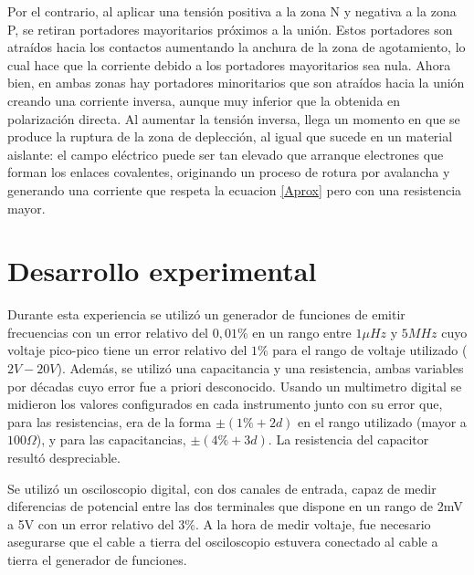 \documentclass[11pt,a4paper]{article}
\begin{document}
 Por el contrario, al aplicar una tensión positiva a la zona N y negativa a la zona P, se retiran portadores mayoritarios próximos a la unión. Estos portadores son atraídos hacia los contactos aumentando la anchura de la zona de agotamiento, lo cual hace que la corriente debido a los portadores mayoritarios sea nula. Ahora bien, en ambas zonas hay portadores minoritarios que son atraídos hacia la unión creando una corriente inversa, aunque muy inferior que la obtenida en polarización directa. Al aumentar la tensión inversa, llega un momento en que se produce la ruptura de la zona de deplección, al igual que sucede en un material aislante: el campo eléctrico puede ser tan elevado que arranque electrones que forman los enlaces covalentes, originando un proceso de rotura por avalancha y generando una corriente que respeta la ecuacion \eqref{Aprox} pero con una resistencia mayor.


\section{Desarrollo experimental}

Durante esta experiencia se utilizó un generador de funciones de emitir frecuencias con un error relativo del $0,01\%$ en un rango entre $1\mu Hz$ y $5MHz$ cuyo voltaje pico-pico tiene un error relativo del $1\%$ para el rango de voltaje utilizado ($2V-20V$). Además, se utilizó una capacitancia y una resistencia, ambas variables por décadas cuyo error fue a priori desconocido. Usando un multimetro digital se midieron los valores configurados en cada instrumento junto con su error que, para las resistencias, era de la forma $\pm(1\%+2d)$ en el rango utilizado (mayor a $100\Omega$), y para las  capacitancias, $\pm(4\%+3d)$. La resistencia del capacitor resultó despreciable.

Se utilizó un osciloscopio digital, con dos canales de entrada, capaz de medir diferencias de potencial entre las dos terminales que dispone en un rango de 2mV a 5V con un error relativo del $3\%$. A la hora de medir voltaje, fue necesario asegurarse que el cable a tierra del osciloscopio estuvera conectado al cable a tierra el generador de funciones. 
\end{document}
